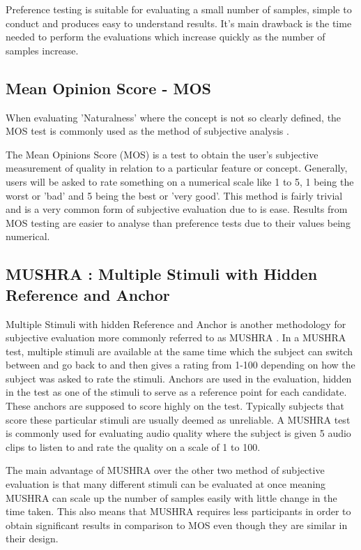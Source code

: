 \documentclass[bsc,frontabs,twoside,singlespacing,parskip,deptreport]{infthesis}
\begin{document}
Preference testing is suitable for evaluating a small number of samples, simple to conduct and produces easy to understand results. It's main drawback is the time needed to perform the evaluations which increase quickly as the number of samples increase.

\subsection{Mean Opinion Score - MOS}

When evaluating 'Naturalness' where the concept is not so clearly defined, the MOS test is commonly used as the method of subjective analysis \cite{mos}.

The Mean Opinions Score (MOS) is a test to obtain the user's subjective measurement of quality in relation to a particular feature or concept. Generally, users will be asked to rate something on a numerical scale like 1 to 5, 1 being the worst or 'bad' and 5 being the best or 'very good'. This method is fairly trivial and is a very common form of subjective evaluation due to is ease. Results from MOS testing are easier to analyse than preference tests due to their values being numerical.

\subsection{MUSHRA : Multiple Stimuli with Hidden Reference and Anchor}

Multiple Stimuli with hidden Reference and Anchor is another methodology for subjective evaluation more commonly referred to as MUSHRA \cite{mushra}. In a MUSHRA test, multiple stimuli are available at the same time which the subject can switch between and go back to and then gives a rating from 1-100 depending on how the subject was asked to rate the stimuli. Anchors are used in the evaluation, hidden in the test as one of the stimuli to serve as a reference point for each candidate. These anchors are supposed to score highly on the test. Typically subjects that score these particular stimuli are usually deemed as unreliable. A MUSHRA test is commonly used for evaluating audio quality \cite{mushra_bbc} where the subject is given 5 audio clips to listen to and rate the quality on a scale of 1 to 100.

The main advantage of MUSHRA over the other two method of subjective evaluation is that many different stimuli can be evaluated at once meaning MUSHRA can scale up the number of samples easily with little change in the time taken. This also means that MUSHRA requires less participants in order to obtain significant results in comparison to MOS even though they are similar in their design.
\end{document}
